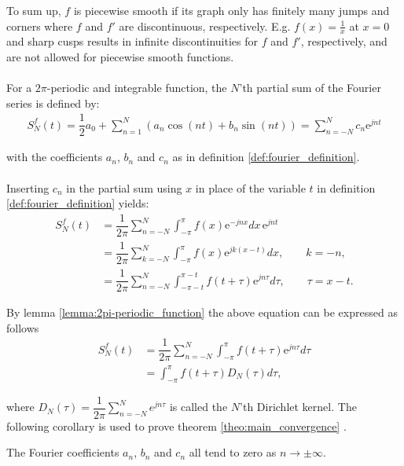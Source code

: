 To sum up, $f$ is piecewise smooth if its graph only has finitely many jumps and corners where $f$ and $f'$ are discontinuous, respectively. E.g. $f(x) = \frac{1}{x}$ at $x = 0$ and sharp cusps results in infinite discontinuities for $f$ and $f'$, respectively, and are not allowed for piecewise smooth functions.
\\ \\
For a $2\pi$-periodic and integrable function, the $N$'th partial sum of the Fourier series is defined by:
\begin{align}\label{eq:partialsumFourierSeries}
	S_N^f(t) = \dfrac{1}{2} a_0 + \sum_{n=1}^N\left(a_n \cos(n 		t) + b_n \sin(n t) \right) = \sum_{n=-N}^N c_n \text{e}^{j n t}
\end{align}

with the coefficients $a_n$, $b_n$ and $c_n$ as in definition \ref{def:fourier_definition}.
\\ \\
Inserting $c_n$ in the partial sum using $x$ in place of the variable $t$ in definition \ref{def:fourier_definition} yields:
\begin{align*}
	S_N^f(t)
	&= \dfrac{1}{2\pi}\sum_{n=-N}^N \int_{-\pi}^\pi f(x) 			\text{e}^{-j n x} dx\, \text{e}^{j n t} \\
	&= \dfrac{1}{2\pi}\sum_{k = -N}^N \int_{-\pi}^\pi f(x) 			\text{e}^{j k (x-t)} dx, \quad \quad k = -n, \\
	&= \dfrac{1}{2\pi} \sum_{n = -N}^N \int_{-\pi - t}^{\pi - 		t} f(t + \tau ) \text{e}^{j n \tau} d\tau, \quad \quad \tau 	= x-t.
\end{align*}

By lemma \ref{lemma:2pi-periodic_function} the above equation can be expressed as follows
\begin{align} \label{eq:dirichlet}
	S_N^f (t) 
	&= \dfrac{1}{2\pi} \sum_{n=-N}^N \int_{-\pi}^\pi f(t + 			\tau) \text{e}^{j n \tau} d\tau \nonumber \\
	&= \int_{-\pi}^\pi f(t + \tau) D_N(\tau) d\tau,
\end{align}

where $D_N(\tau) = \dfrac{1}{2\pi}\sum_{n=-N}^{N}e^{j n \tau}$ is called the $N$'th Dirichlet kernel. The following corollary is used to prove theorem \ref{theo:main_convergence} \cite{page 31, FAA}.

\begin{corollary} \label{coro:conv_Fourier_coeff}
The Fourier coefficients $a_n$, $b_n$ and $c_n$ all tend to zero as $n \to \pm \infty$.
\end{corollary}

